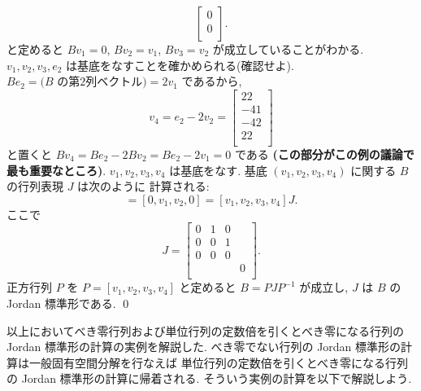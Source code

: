 \documentclass[12pt,twoside]{jarticle}
\begin{document}
\begin{example}
\begin{equation*}
\begin{bmatrix}
      0 \\
      0 \\
    \end{bmatrix}.
  \end{equation*}
  と定めると $Bv_1=0$, $Bv_2=v_1$, $Bv_3=v_2$ が成立していることがわかる.
  $v_1,v_2,v_3,e_2$ は基底をなすことを確かめられる(確認せよ).
  $Be_2 = \text{($B$ の第2列ベクトル)} = 2v_1$ であるから,
  \begin{equation*}
    v_4 = e_2 - 2v_2 =
    \begin{bmatrix}
       22 \\
      -41 \\
      -42 \\
       22 \\
    \end{bmatrix}
  \end{equation*}
  と置くと $Bv_4=Be_2-2Bv_2=Be_2-2v_1=0$ である
  {\bf (この部分がこの例の議論で最も重要なところ)}.
  $v_1,v_2,v_3,v_4$ は基底をなす.
  基底 $(v_1,v_2,v_3,v_4)$ に関する $B$ の行列表現 $J$ は次のように
  計算される:
  \begin{equation*}
    [Bv_1,Bv_2,Bv_3,Bv_4]
    = [0,v_1,v_2,0]
    = [v_1,v_2,v_3,v_4] J.
  \end{equation*}
  ここで
  \begin{equation*}
    J = 
    \begin{bmatrix}
      0 & 1 & 0 &   \\
      0 & 0 & 1 &   \\
      0 & 0 & 0 &   \\
        &   &   & 0 \\
    \end{bmatrix}.
  \end{equation*}
  正方行列 $P$ を $P=[v_1,v_2,v_3,v_4]$ と定めると $B=PJP^{-1}$ が成立し, 
  $J$ は $B$ の Jordan 標準形である.
  \qed
\end{example}

以上においてべき零行列および単位行列の定数倍を引くとべき零になる行列の
Jordan 標準形の計算の実例を解説した.
べき零でない行列の Jordan 標準形の計算は一般固有空間分解を行なえば
単位行列の定数倍を引くとべき零になる行列の Jordan 標準形の計算に帰着される.
そういう実例の計算を以下で解説しよう.
\end{document}
